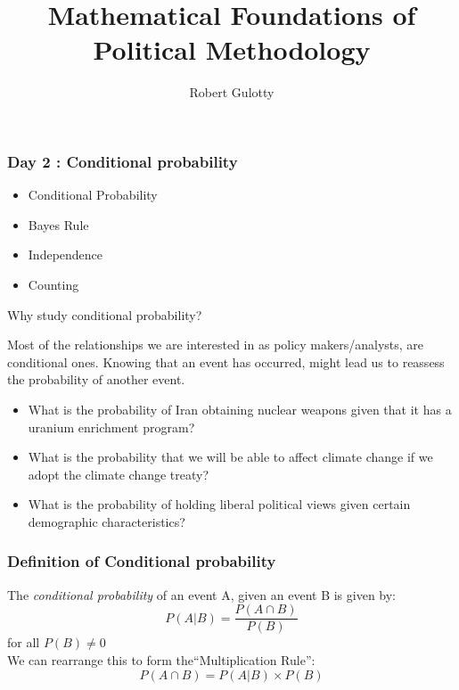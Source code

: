 \documentclass[handout]{beamer}
\title[PLSC 43401]{Mathematical Foundations of Political Methodology}
\author{Robert Gulotty}
\institute[Chicago]{University of Chicago}
\numberwithin{equation}{section}
\begin{document}
\begin{frame}
\maketitle
\end{frame}

\begin{frame}
\frametitle{Day 2 : Conditional probability}

\begin{itemize}
\item Conditional Probability
\item Bayes Rule
\item Independence
\item Counting
\end{itemize}
\end{frame}

\begin{frame}{Why study conditional probability?}

Most of the relationships we are interested in as policy makers/analysts, are conditional ones. Knowing that an event has occurred, might lead us to reassess the probability of another event.\pause

\begin{itemize}
\item What is the probability of Iran obtaining nuclear weapons given that it has a uranium enrichment program?\pause
\item What is the probability that we will be able to affect climate change if we adopt the climate change treaty?\pause
\item What is the probability of holding liberal political views given certain demographic characteristics?
\end{itemize}
\end{frame}

\begin{frame}
\frametitle{Definition of Conditional probability}
The \emph{conditional probability} of an event A, given an event B is given by:
$$P(A|B)=\frac{P(A\cap B)}{P(B)}$$
for all $P(B)\neq 0$\\
\pause We can rearrange this to form the``Multiplication Rule'':
$$P(A\cap B)=P(A|B)\times P(B)$$

\end{frame}
\end{document}
